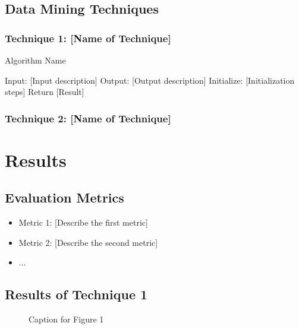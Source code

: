 \documentclass[11pt]{article}
\begin{document}
    \subsection{Data Mining Techniques}
    \label{subsec:techniques}
    \lipsum[11] %
    \subsubsection{Technique 1: [Name of Technique]}
    \label{subsubsec:technique1}
    \lipsum[12] %
    \begin{algorithm}
        \caption{Algorithm Name}
        \begin{algorithmic}[1]
            \State Input: [Input description]
            \State Output: [Output description]
            \State Initialize: [Initialization steps]
            \While{[Condition]}
                \State [Step 1]
                \State [Step 2]
            \EndWhile
            \State Return [Result]
        \end{algorithmic}
    \end{algorithm}

    \subsubsection{Technique 2: [Name of Technique]}
    \label{subsubsec:technique2}
    \lipsum[13] %

    \section{Results}
    \label{sec:results}

    \subsection{Evaluation Metrics}
    \label{subsec:metrics}
    \lipsum[14] %
    \begin{itemize}
        \item Metric 1: [Describe the first metric]
        \item Metric 2: [Describe the second metric]
        \item ...
    \end{itemize}

    \subsection{Results of Technique 1}
    \label{subsec:results1}
    \lipsum[15] %
    \begin{figure}[H]
        \centering
        \caption{Caption for Figure 1}
        \label{fig:figure1}
    \end{figure}
\end{document}
